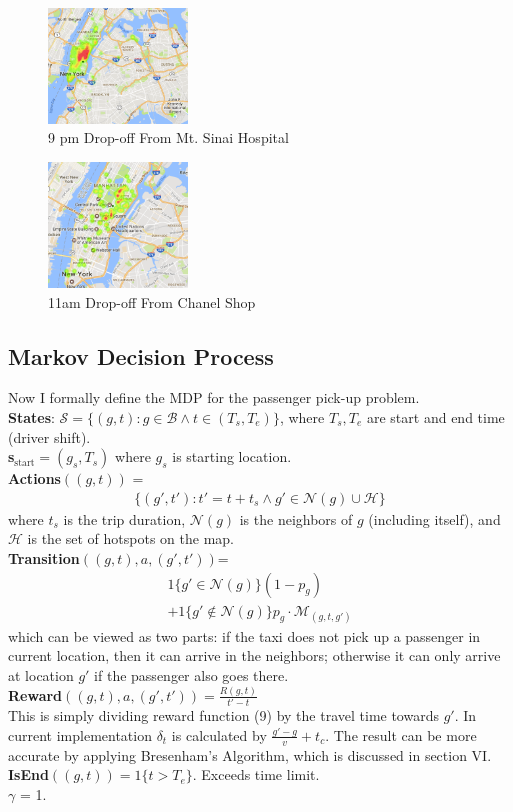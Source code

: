 \documentclass[letterpaper, 10 pt, conference]{ieeeconf}
\begin{document}
\begin{figure}
\centering
\includegraphics[width=0.33\textwidth]{9-MtSinaiHospital.png}
\caption{9 pm Drop-off From Mt. Sinai Hospital}
\end{figure}
\begin{figure}
\centering
\includegraphics[width=0.33\textwidth]{11-chanel-shop.png}
\caption{11am Drop-off From Chanel Shop}
\end{figure}
\subsection{Markov Decision Process}
Now I formally define the MDP for the passenger pick-up problem.\\
\textbf{States}: $\mathcal{S} = \{(g, t): g\in\mathcal{B}\wedge t\in(T_s, T_e)\}$, where $T_s, T_e$ are start and end time (driver shift).\\
\textbf{s$_{\text{start}}$}$=(g_s, T_s)$ where $g_s$ is starting location.\\
\textbf{Actions$((g, t))$} =
\begin{align}
\{(g', t'):t'= t+t_s\wedge g'\in\mathcal{N}(g)\cup\mathcal{H}\}
\end{align}
where $t_s$ is the trip duration, $\mathcal{N}(g)$ is the neighbors of $g$ (including itself), and $\mathcal{H}$ is the set of hotspots on the map.\\
\textbf{Transition$((g,t), a, (g',t'))$}=
\begin{align}
1\{g'\in\mathcal{N}(g)\}(1-p_g)\\
+1\{g'\not\in\mathcal{N}(g)\}p_g\cdot\mathcal{M}_{(g,t,g')}
\end{align}
which can be viewed as two parts: if the taxi does not pick up a passenger in current location, then it can arrive in the neighbors; otherwise it can only arrive at location $g'$ if the passenger also goes there.\\
\textbf{Reward}$((g,t), a, (g',t'))=\frac{R(g,t)}{t'-t}$\\
This is simply dividing reward function (9) by the travel time towards $g'$. In current implementation $\delta_t$ is calculated by $\frac{g'-g}{v}+t_c$. The result can be more accurate by applying Bresenham's Algorithm, which is discussed in section VI.\\
\textbf{IsEnd}$((g,t))=1\{t>T_e\}$. Exceeds time limit.\\
\textbf{$\gamma$} = 1.
\end{document}
